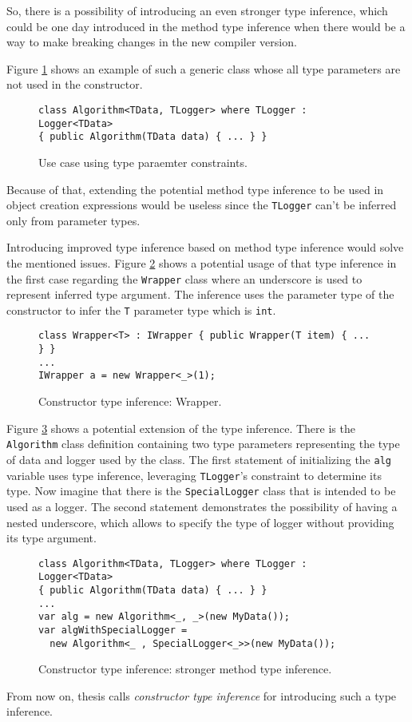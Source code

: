 So, there is a possibility of introducing an even stronger type inference, which could be one day introduced in the method type inference when there would be a way to make breaking changes in the new compiler version. 
\par
Figure \ref{img36:cti} shows an example of such a generic class whose all type parameters are not used in the constructor.
\begin{figure}[h!]
\begin{lstlisting}[style=csharp]
class Algorithm<TData, TLogger> where TLogger : Logger<TData> 
{ public Algorithm(TData data) { ... } }
\end{lstlisting}
\caption{Use case using type paraemter constraints.}
\label{img36:cti}
\end{figure}
Because of that, extending the potential method type inference to be used in object creation expressions would be useless since the \texttt{TLogger} can’t be inferred only from parameter types.
\par
Introducing improved type inference based on method type inference would solve the mentioned issues. 
Figure \ref{img37:sol1} shows a potential usage of that type inference in the first case regarding the \texttt{Wrapper} class where an underscore is used to represent inferred type argument. 
The inference uses the parameter type of the constructor to infer the \texttt{T} parameter type which is \texttt{int}.
\begin{figure}[h]
\begin{lstlisting}[style=csharp]
class Wrapper<T> : IWrapper { public Wrapper(T item) { ... } }
...
IWrapper a = new Wrapper<_>(1);
\end{lstlisting}
\caption{Constructor type inference: Wrapper.}
\label{img37:sol1}
\end{figure}
\par
Figure \ref{img38:sol2} shows a potential extension of the type inference. 
There is the \texttt{Algorithm} class definition containing two type parameters representing the type of data and logger used by the class.
The first statement of initializing the \texttt{alg} variable uses type inference, leveraging \texttt{TLogger}’s constraint to determine its type.
Now imagine that there is the \texttt{SpecialLogger} class that is intended to be used as a logger.
The second statement demonstrates the possibility of having a nested underscore, which allows to specify the type of logger without providing its type argument.
\begin{figure}[h]
\begin{lstlisting}[style=csharp]
class Algorithm<TData, TLogger> where TLogger : Logger<TData> 
{ public Algorithm(TData data) { ... } }
...
var alg = new Algorithm<_, _>(new MyData());
var algWithSpecialLogger = 
  new Algorithm<_ , SpecialLogger<_>>(new MyData());
\end{lstlisting}
\caption{Constructor type inference: stronger method type inference.}
\label{img38:sol2}
\end{figure}
\par
From now on, thesis calls \textit{constructor type inference} for introducing such a type inference.

